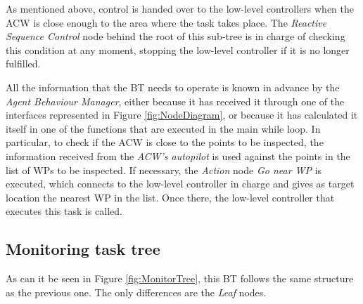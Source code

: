 As mentioned above, control is handed over to the low-level controllers when the \gls{ACW} is close enough to the area where the task takes place. The \emph{Reactive Sequence Control} node behind the root of this sub-tree is in charge of checking this condition at any moment, stopping the low-level controller if it is no longer fulfilled.

All the information that the \gls{BT} needs to operate is known in advance by the \emph{Agent Behaviour Manager}, either because it has received it through one of the interfaces represented in Figure \ref{fig:NodeDiagram}, or because it has calculated it itself in one of the functions that are executed in the main while loop. In particular, to check if the \gls{ACW} is close to the points to be inspected, the information received from the \emph{\gls{ACW}'s autopilot} is used against the points in the list of \glspl{WP} to be inspected. If necessary, the \emph{Action} node \emph{Go near \gls{WP}} is executed, which connects to the low-level controller in charge and gives as target location the nearest \gls{WP} in the list. Once there, the low-level controller that executes this task is called.

\subsection{Monitoring task tree}
\label{sec:MonitoringTaskTree}
As can it be seen in Figure \ref{fig:MonitorTree}, this \gls{BT} follows the same structure as the previous one. The only differences are the \emph{Leaf} nodes.


